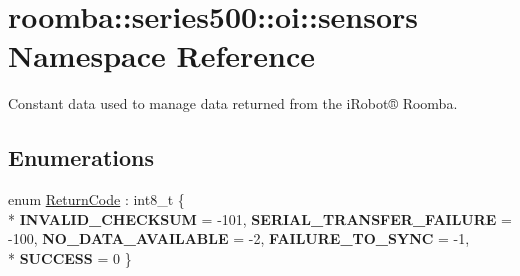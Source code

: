 \hypertarget{namespaceroomba_1_1series500_1_1oi_1_1sensors}{\section{roomba\+:\+:series500\+:\+:oi\+:\+:sensors Namespace Reference}
\label{namespaceroomba_1_1series500_1_1oi_1_1sensors}
}


Constant data used to manage data returned from the i\+Robot® Roomba.  


\subsection*{Enumerations}
\begin{DoxyCompactItemize}
\item 
\hypertarget{namespaceroomba_1_1series500_1_1oi_1_1sensors_afedb9083158162092444b523e0a32ebb}{enum \hyperlink{namespaceroomba_1_1series500_1_1oi_1_1sensors_afedb9083158162092444b523e0a32ebb}{Return\+Code} \+: int8\+\_\+t \{ \\*
{\bfseries I\+N\+V\+A\+L\+I\+D\+\_\+\+C\+H\+E\+C\+K\+S\+U\+M} = -\/101, 
{\bfseries S\+E\+R\+I\+A\+L\+\_\+\+T\+R\+A\+N\+S\+F\+E\+R\+\_\+\+F\+A\+I\+L\+U\+R\+E} = -\/100, 
{\bfseries N\+O\+\_\+\+D\+A\+T\+A\+\_\+\+A\+V\+A\+I\+L\+A\+B\+L\+E} = -\/2, 
{\bfseries F\+A\+I\+L\+U\+R\+E\+\_\+\+T\+O\+\_\+\+S\+Y\+N\+C} = -\/1, 
\\*
{\bfseries S\+U\+C\+C\+E\+S\+S} = 0
 \}}\label{namespaceroomba_1_1series500_1_1oi_1_1sensors_afedb9083158162092444b523e0a32ebb}


\end{DoxyCompactItemize}
